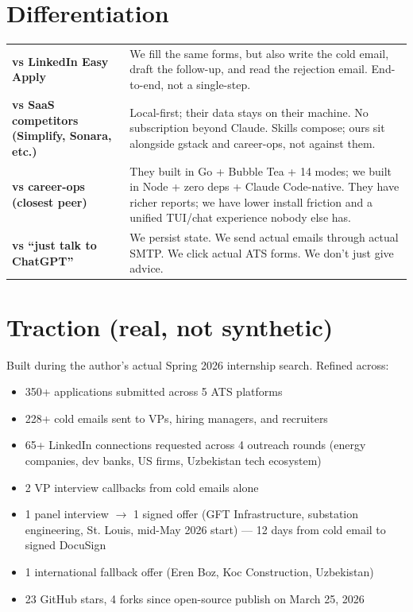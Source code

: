\documentclass[11pt]{article}
\begin{document}
\section{Differentiation}

\begin{tabular}{p{4.2cm}p{10cm}}
\textbf{vs LinkedIn Easy Apply} & We fill the same forms, but also write the cold email, draft the follow-up, and read the rejection email. End-to-end, not a single-step. \\[0.4em]
\textbf{vs SaaS competitors (Simplify, Sonara, etc.)} & Local-first; their data stays on their machine. No subscription beyond Claude. Skills compose; ours sit alongside gstack and career-ops, not against them. \\[0.4em]
\textbf{vs career-ops (closest peer)} & They built in Go + Bubble Tea + 14 modes; we built in Node + zero deps + Claude Code-native. They have richer reports; we have lower install friction and a unified TUI/chat experience nobody else has. \\[0.4em]
\textbf{vs ``just talk to ChatGPT''} & We persist state. We send actual emails through actual SMTP. We click actual ATS forms. We don't just give advice. \\
\end{tabular}

\section{Traction (real, not synthetic)}

Built during the author's actual Spring 2026 internship search. Refined across:

\begin{itemize}
  \item 350+ applications submitted across 5 ATS platforms
  \item 228+ cold emails sent to VPs, hiring managers, and recruiters
  \item 65+ LinkedIn connections requested across 4 outreach rounds (energy companies, dev banks, US firms, Uzbekistan tech ecosystem)
  \item 2 VP interview callbacks from cold emails alone
  \item 1 panel interview $\to$ 1 signed offer (GFT Infrastructure, substation engineering, St. Louis, mid-May 2026 start) --- 12 days from cold email to signed DocuSign
  \item 1 international fallback offer (Eren Boz, Koc Construction, Uzbekistan)
  \item 23 GitHub stars, 4 forks since open-source publish on March 25, 2026
\end{itemize}
\end{document}
